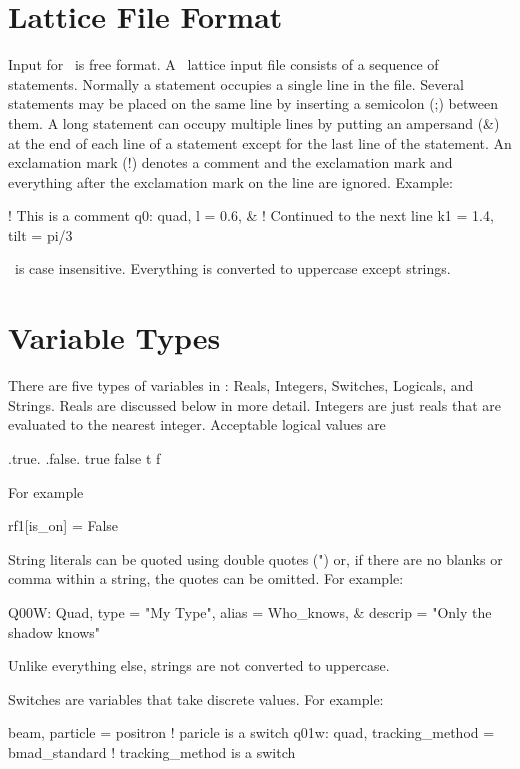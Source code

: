\section{Lattice File Format}

Input for \bmad\ is free format. A \bmad\ lattice input file consists
of a sequence of statements. Normally a statement occupies a single
line in the file. Several statements may be placed on the same line by
inserting a semicolon (;) between them. A long statement can occupy
multiple lines by putting an ampersand (\&) at the end of each line of
a statement except for the last line of the statement. An
exclamation mark (!) denotes a comment and the exclamation mark and
everything after the exclamation mark on the line are ignored. Example:
\begin{example}
  ! This is a comment
  q0: quad, l = 0.6, &     ! Continued to the next line
        k1 = 1.4, tilt = pi/3
\end{example}
\bmad\ is case insensitive. Everything is converted to uppercase except strings.

\section{Variable Types}

There are five types of variables in \bmad: Reals, Integers, Switches, 
Logicals, and 
Strings. Reals are discussed below in more detail. Integers are just reals
that are evaluated to the nearest integer. Acceptable logical values are
\begin{example}
  .true.  .false.
   true    false
   t       f
\end{example}
For example
\begin{example}
  rf1[is_on] = False
\end{example}

\vskip0.1in
String literals can be quoted using double quotes (") or, if there are no
blanks or comma within a string, the quotes can be omitted. For example:
\begin{example}
  Q00W: Quad, type = "My Type", alias = Who_knows, &
                                  descrip = "Only the shadow knows"
\end{example}
Unlike everything else, strings are not converted to uppercase.

Switches are variables that take discrete values. For example:
\begin{example}
  beam, particle = positron                    ! paricle is a switch
  q01w: quad, tracking\_method = bmad\_standard  ! tracking\_method is a switch
\end{example}

